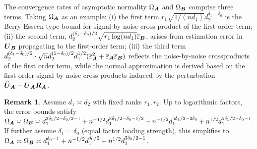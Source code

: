 \documentclass[11pt,letterpaper]{article}
\theoremstyle{definition}
\newtheorem{remark}{Remark}
\begin{document}
The convergence rates of asymptotic normality $\Omega_{\boldsymbol{A}}$ and $\Omega_{\boldsymbol{B}}$ comprise three terms. Taking $\Omega_{\boldsymbol{A}}$ as an example: (i) the first term $r_1\sqrt{1/(nd_1)}d_2^{\delta_1-\delta_0}$ is the Berry Esseen type bound for signal-by-noise cross-product of the first-order term; (ii) the second term, $ d_2^{(\delta_1-\delta_0)/2} \sqrt{r_1\log(nd_1)} \overline{\varepsilon}_{\boldsymbol{B}}$, arises from estimation error in $\boldsymbol{U}_{\boldsymbol{B}}$ propagating to the first-order term; (iii) the third term $d_2^{(\delta_1-\delta_0)/2} \cdot \sqrt{n} d_2^{(1-\delta_0)/2}d_1^{1/2} (\overline{\varepsilon}_{\boldsymbol{A}}^2 + \overline{\varepsilon}_{\boldsymbol{A}}\overline{\varepsilon}_{\boldsymbol{B}} )$ reflects the noise-by-noise crossproducts of the first order term, while the normal approximation is derived based on the first-order signal-by-noise cross-products induced by the perturbation $\widehat{\boldsymbol{U}}_{\boldsymbol{A}} - \boldsymbol{U}_{\boldsymbol{A}}\boldsymbol{R}_{\boldsymbol{A}}$.





\begin{remark}
Assume $d_1 \asymp d_2$ with fixed ranks $r_1,r_2$. Up to logarithmic factors, the error bounds satisfy
$
\Omega_{\boldsymbol{A}} \asymp \Omega_{\boldsymbol{B}} 
\asymp  d_1^{3\delta_1/2-\delta_0/2-1} + n^{-1/2} d_1^{3\delta_1/2-\delta_0-1/2} +n^{-1/2} d_1^{5\delta_1/2 -2 \delta_0} +n^{1/2} d_1^{ 5\delta_1/2-\delta_0-1} .
$
If further assume $\delta_1=\delta_0$ (equal factor loading strength), this simplifies to
$\Omega_{\boldsymbol{A}} \asymp \Omega_{\boldsymbol{B}} \asymp  d_1^{\delta_0-1} + n^{-1/2} d_1^{\delta_0/2 } +n^{1/2} d_1^{ 3\delta_0/2-1}$.
\end{remark}
\end{document}
